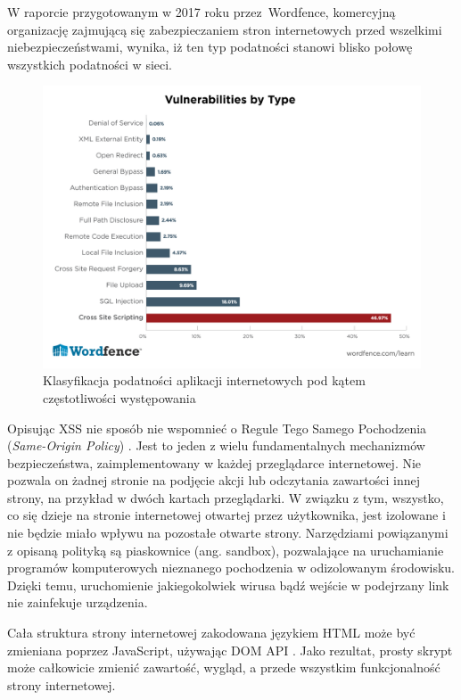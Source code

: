 \documentclass[12pt,twoside]{article}
\begin{document}
W raporcie przygotowanym w 2017 roku przez Wordfence, komercyjną organizację zajmującą się zabezpieczaniem stron internetowych przed wszelkimi niebezpieczeństwami, wynika, iż ten typ podatności stanowi blisko połowę wszystkich podatności w sieci.

\begin{figure}[H]
	\centering
	\includegraphics[width=0.9\linewidth]{figures/xss-popularity}
	\caption{Klasyfikacja podatności aplikacji internetowych pod kątem częstotliwości występowania \cite{XSSReport}}
	\label{fig:xss-popularity}
\end{figure}



Opisując XSS nie sposób nie wspomnieć o Regule Tego Samego Pochodzenia (\emph{Same-Origin Policy}) \cite{SameOriginPolicy}. Jest to jeden z wielu fundamentalnych mechanizmów bezpieczeństwa, zaimplementowany w każdej przeglądarce internetowej. Nie pozwala on żadnej stronie na podjęcie akcji lub odczytania zawartości innej strony, na przykład w dwóch kartach przeglądarki. W związku z tym, wszystko, co się dzieje na stronie internetowej otwartej przez użytkownika, jest izolowane i nie będzie miało wpływu na pozostałe otwarte strony. Narzędziami powiązanymi z opisaną polityką są piaskownice (ang. sandbox), pozwalające na uruchamianie programów komputerowych nieznanego pochodzenia w odizolowanym środowisku. Dzięki temu, uruchomienie jakiegokolwiek wirusa bądź wejście w podejrzany link nie zainfekuje urządzenia.
	
	Cała struktura strony internetowej zakodowana językiem HTML może być zmieniana poprzez JavaScript, używając DOM API \cite{DOM}. Jako rezultat, prosty skrypt może całkowicie zmienić zawartość, wygląd, a przede wszystkim funkcjonalność strony internetowej.
	
\end{document}
